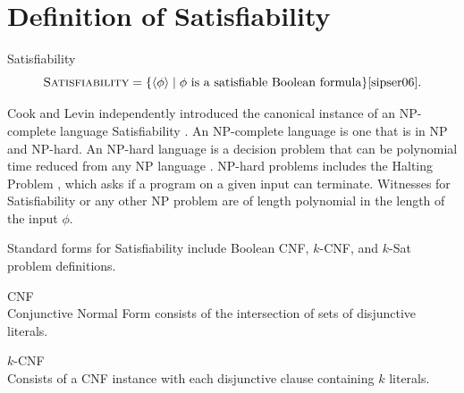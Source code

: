 
	
\section{Definition of {\sc Satisfiability}}

	

\begin{definition}
{\sc Satisfiability}\\
\[
\text{\sc Satisfiability} = \{ \langle \phi \rangle \mid \phi \text{ is a satisfiable Boolean formula}\} \cite{sipser06}.
\]	
\end{definition}

Cook and Levin independently introduced the canonical instance of an \textsf{NP-complete} language {\sc Satisfiability} \cite{Cook:1971:CTP:800157.805047, levin1973}.  An \textsf{NP-complete} language is one that is in \textsf{NP} and \textsf{NP-hard}.  An \textsf{NP-hard} language is a decision problem that can be polynomial time reduced from any \textsf{NP} language \cite{sipser06}.  \textsf{NP-hard} problems includes the {\sc Halting Problem} \cite{sipser06}, which asks if a program on a given input can terminate.  Witnesses for {\sc Satisfiability} or any other \textsf{NP} problem are of length polynomial in the length of the input $\phi$.

Standard forms for {\sc Satisfiability} include Boolean CNF, $k$-CNF, and $k$-{\sc Sat} problem definitions.

\begin{definition}
CNF\\
Conjunctive Normal Form consists of the intersection of sets of disjunctive literals. 
\end{definition}

\begin{definition}
$k$-CNF\\
Consists of a CNF instance with each disjunctive clause containing $k$ literals.
\end{definition}

